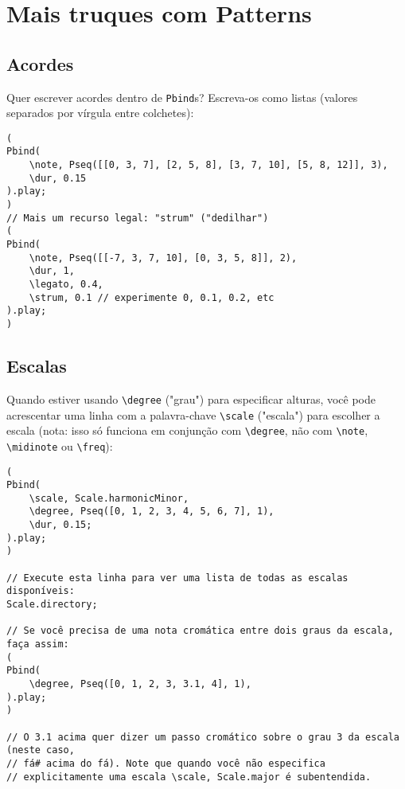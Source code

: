 \section{Mais truques com Patterns}

\subsection{Acordes}

Quer escrever acordes dentro de \texttt{Pbind}s? Escreva-os como listas (valores separados por vírgula entre colchetes):
 
\begin{lstlisting}[style=SuperCollider-IDE, basicstyle=\scttfamily\footnotesize]
(
Pbind(
	\note, Pseq([[0, 3, 7], [2, 5, 8], [3, 7, 10], [5, 8, 12]], 3),
	\dur, 0.15
).play;
)
// Mais um recurso legal: "strum" ("dedilhar")
(
Pbind(
	\note, Pseq([[-7, 3, 7, 10], [0, 3, 5, 8]], 2),
	\dur, 1,
	\legato, 0.4,
	\strum, 0.1 // experimente 0, 0.1, 0.2, etc
).play;
)
\end{lstlisting}
 

\subsection{Escalas}

Quando estiver usando \texttt{\textbackslash degree} ("grau") para especificar alturas, você pode acrescentar uma linha com a palavra-chave \texttt{\textbackslash scale} ("escala") para escolher a escala (nota: isso só funciona em conjunção com \texttt{\textbackslash degree}, não com \texttt{\textbackslash note}, \texttt{\textbackslash midinote} ou \texttt{\textbackslash freq}):

 
\begin{lstlisting}[style=SuperCollider-IDE, basicstyle=\scttfamily\footnotesize]
(
Pbind(
	\scale, Scale.harmonicMinor,
	\degree, Pseq([0, 1, 2, 3, 4, 5, 6, 7], 1),
	\dur, 0.15;
).play;
)

// Execute esta linha para ver uma lista de todas as escalas disponíveis:
Scale.directory;

// Se você precisa de uma nota cromática entre dois graus da escala, faça assim:
(
Pbind(
	\degree, Pseq([0, 1, 2, 3, 3.1, 4], 1),
).play;
)

// O 3.1 acima quer dizer um passo cromático sobre o grau 3 da escala (neste caso,
// fá# acima do fá). Note que quando você não especifica
// explicitamente uma escala \scale, Scale.major é subentendida.
\end{lstlisting}

